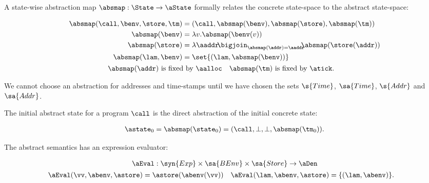 A state-wise abstraction map $\absmap : \State \to \aState$ formally relates the concrete
state-space to the abstract state-space:
\begin{small}
\begin{gather*}
\begin{align*}
  \absmap(\call,\benv,\store,\tm) &=
  (\call, \absmap(\benv), \absmap(\store), \absmap(\tm))
  \\
  \absmap(\benv) &= \lambda v . \absmap(\benv(v))
  \\
  \absmap(\store) &= \lambda \aaddr . \!\!\! \bigjoin_{\absmap(\addr) = \aaddr} \!\!\! \absmap(\store(\addr))
  \\
  \absmap(\lam,\benv) &= \set{(\lam,\absmap(\benv))}
\end{align*}\\
\begin{align*}
  \absmap(\addr) &\text{ is fixed by }\aalloc
  &
  \absmap(\tm) &\text{ is fixed by }\atick\text.
\end{align*}\end{gather*}\end{small}We cannot choose an abstraction for addresses and time-stamps until we
have chosen the sets $\s{Time}$, $\sa{Time}$, $\s{Addr}$ and
$\sa{Addr}$.



The initial abstract state for a program $\call$ is the direct
abstraction of the initial concrete state:
\begin{small}\begin{align*}
  \astate_0 = \absmap(\state_0) = (\call,\bot,\bot,\absmap(\tm_0))
  \text.
\end{align*}\end{small}The abstract semantics has an expression evaluator:
\begin{small}
\begin{gather*}
  \aEval : \syn{Exp} \times \sa{BEnv} \times \sa{Store} \to \aDen
  \\
\begin{align*}
  \aEval(\vv,\abenv,\astore) &= \astore(\abenv(\vv))
  &
  \aEval(\lam,\abenv,\astore) &= \{ (\lam, \abenv) \}
  \text.
\end{align*}\end{gather*}\end{small}




